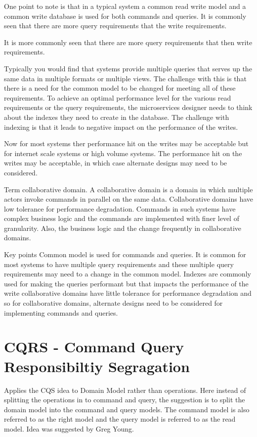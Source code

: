 \documentclass[a4paper, 11pt]{book}
\begin{document}
    One point to note is that in a typical system a common read write model and a common write database is used for both commands and queries.
    It is commonly seen that there are more query requirements that the write requirements.

    It is more commonly seen that there are more query requirements that then write requirements.

    Typically you would find that systems provide multiple queries that serves up the same data in multiple formats or multiple views.
    The challenge with this is that there is a need for the common model to be changed for meeting all of these requirements.
    To achieve an optimal performance level for the various read requirements or the query requirements, the microservices designer needs to think about the indexes they need to create in the database.
    The challenge with indexing is that it leads to negative impact on the performance of the writes.

    Now for most systems ther performance hit on the writes may be acceptable but for internet scale systems or high volume systems.
    The performance hit on the writes may be acceptable, in which case alternate designs may need to be considered.

    Term collaborative domain.
    A collaborative domain is a domain in which multiple actors invoke commands in parallel on the same data.
    Collaborative domains have low tolerance for performance degradation.
    Commands in such systems have complex business logic and the commands are implemented with finer level of granularity.
    Also, the business logic and the change frequently in collaborative domains.

    Key points
    Common model is used for commands and queries.
    It is common for most systems to have multiple query requirements and these multiple query requirements may need to a change in the common model.
    Indexes are commonly used for making the queries performant but that impacts the performance of the write collaborative domains have little tolerance for performance degradation and so for collaborative domains, alternate designs need to be considered for implementing commands and queries.



    \section{CQRS - Command Query Responsibiltiy Segragation}
    Applies the CQS idea to Domain Model rather than operations.
    Here instead of splitting the operations in to command and query, the suggestion is to split the domain model into the command and query models.
    The command model is also referred to as the right model and the query model is referred to as the read model.
    Idea was suggested by Greg Young.
\end{document}
